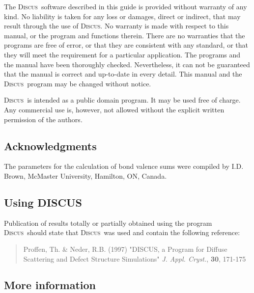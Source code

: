 \documentclass[11pt]{report}
\newcommand{\discus}{\textsc{Discus}}
\newcommand{\Discus}{\textsc{Discus\ }}
\begin{document}
The \Discus software described in this guide is
provided without warranty of any kind.  No liability is taken for any loss
or damages, direct or indirect, that may result through the use of \discus.
No warranty is made with respect to this manual, or the program
and functions therein.  There are no warranties that the programs are free
of error, or that they are consistent with any standard, or that they will
meet the requirement for a particular application.  The programs and the
manual have been thoroughly checked.  Nevertheless, it can not be
guaranteed that the manual is correct and up-to-date in every detail. This
manual and the \Discus program may be changed without notice.\par

\Discus is intended as a public domain program.  It may be used free
of charge.  Any commercial use is, however, not allowed without the
explicit written permission of the authors.


\subsection*{Acknowledgments}

The parameters for the calculation of bond valence sums were compiled by I.D.
Brown, McMaster University, Hamilton, ON, Canada.


\subsection*{Using DISCUS}

Publication of results totally or partially obtained using the program 
\Discus should state that \Discus was used and contain the following
reference:

\begin{quote}
  {\sc Proffen, Th. \& Neder, R.B.} (1997) "DISCUS, a Program
  for Diffuse Scattering and Defect Structure Simulations"
  {\it J. Appl. Cryst.}, {\bf 30}, 171-175
\end{quote}


\newpage
\subsection*{More information}
\end{document}
